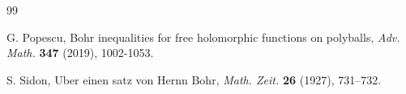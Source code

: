 \documentclass[a4paper,12pt]{amsart}
\theoremstyle{definition}
\begin{document}
\begin{thebibliography}{99}
	
	 {\sc G. Popescu}, Bohr inequalities for free holomorphic functions on polyballs, {\it Adv. Math.} {\bf 347} (2019), 1002-1053.
	
	
	
	
	
	
	
	
	
		 {\sc S. Sidon}, Uber einen satz von Hernn Bohr, {\it Math. Zeit.}  {\bf 26} (1927),  731--732.
	
	
	

\end{thebibliography}
\end{document}
